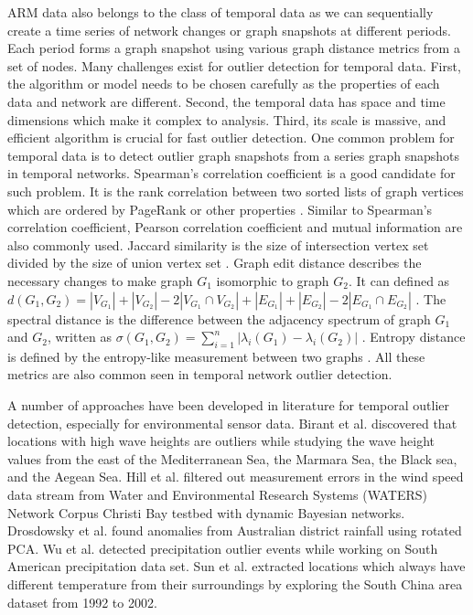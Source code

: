 ARM data also belongs to the class of temporal data as we can sequentially create a
time series of network changes or graph snapshots at different periods.
Each period forms a graph snapshot using various graph distance metrics
from a set of nodes. Many challenges exist for outlier detection for
temporal data. First, the algorithm or model needs to be chosen
carefully as the properties of each data and network are different.
Second, the temporal data has space and time dimensions which make it
complex to analysis. Third, its scale is massive, and efficient algorithm
is crucial for fast outlier detection. One common problem for temporal
data is to detect outlier graph snapshots from a series graph snapshots
in temporal networks. Spearman's correlation coefficient is a good
candidate for such problem. It is the rank correlation between two
sorted lists of graph vertices which are ordered by PageRank or other
properties \cite{papadimitriou2010web}. Similar to Spearman's
correlation coefficient, Pearson correlation coefficient and mutual information are also
commonly used. Jaccard similarity is the size of intersection vertex set
divided by the size of union vertex set \cite{jay2012systematic}. Graph
edit distance describes the necessary changes to make graph $G_1$
isomorphic to graph $G_2$. It can defined as $d(G_1, G_2) = |V_{G_1}| +
|V_{G_2}| - 2|V_{G_1} \cap V_{G_2}| + |E_{G_1}| + |E_{G_2}| - 2|E_{G_1}
\cap E_{G_2}|$ \cite{papadimitriou2010web}. The spectral distance is the
difference between the adjacency spectrum of graph $G_1$ and $G_2$,
written as $\sigma(G_1, G_2) =
\displaystyle\sum_{i=1}^{n}|\lambda_i(G_1) - \lambda_i(G_2)|$
\cite{jovanovic2012spectral}. Entropy distance is defined by
the entropy-like measurement between two graphs
\cite{pincombe2005anomaly}. All these metrics are also common
seen in temporal network outlier detection.

A number of approaches have been developed in literature for temporal outlier detection,
especially for environmental sensor data. Birant et al.
\cite{kut2006spatio} discovered that locations with high wave heights
are outliers while studying the wave height values from the east of
the Mediterranean Sea, the Marmara Sea, the Black sea, and the
Aegean Sea. Hill et al. \cite{hill2007real, hill2010anomaly}
filtered out measurement errors in the wind speed data stream from
Water and Environmental Research Systems (WATERS) Network Corpus
Christi Bay testbed with dynamic Bayesian networks. Drosdowsky et
al. \cite{drosdowsky1993analysis} found anomalies from Australian
district rainfall using rotated PCA. Wu et al. \cite{wu2010spatio}
detected precipitation outlier events while working on South
American precipitation data set. Sun et al.
\cite{yuxiang2005detecting} extracted locations which always have
different temperature from their surroundings by exploring the
South China area dataset from 1992 to 2002.


